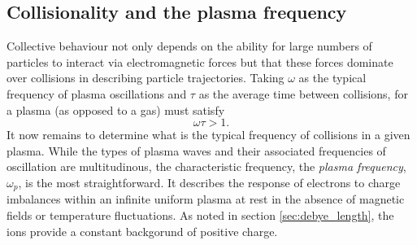 \subsection{\label{sec:plasma_frequency}Collisionality and the plasma frequency}
Collective behaviour not only depends on the ability for large numbers of particles to interact via electromagnetic forces but that these forces dominate over collisions in describing particle trajectories. Taking $\omega$ as the typical frequency of plasma oscillations and $\tau$ as the average time between collisions, for a plasma (as opposed to a gas) must satisfy
\begin{equation}\label{eq:plasma_frequency_condition}
	\omega\tau > 1.
\end{equation}
It now remains to determine what is the typical frequency of collisions in a given plasma. While the types of plasma waves and their associated frequencies of oscillation are multitudinous, the characteristic frequency, the \textit{plasma frequency}, $\omega_p$, is the most straightforward. It describes the response of electrons to charge imbalances within an infinite uniform plasma at rest in the absence of magnetic fields or temperature fluctuations. As noted in section \ref{sec:debye_length}, the ions provide a constant backgorund of positive charge.

